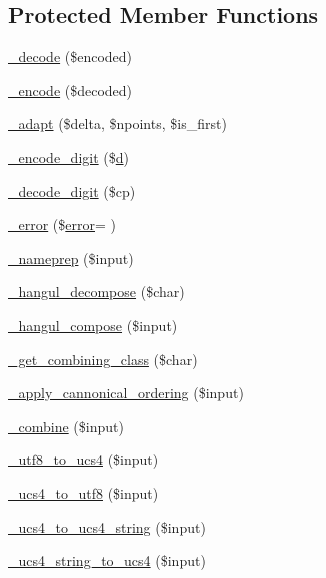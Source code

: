 \subsection*{Protected Member Functions}
\begin{DoxyCompactItemize}
\item 
\hyperlink{classidna__convert_a6e4c2f051cfd4ebd84d47c013c18205e}{\+\_\+decode} (\$encoded)
\item 
\hyperlink{classidna__convert_aa32f14e1635b5bcf8a1000721a53db8d}{\+\_\+encode} (\$decoded)
\item 
\hyperlink{classidna__convert_a521d4543ec6839af3283be4380e91a86}{\+\_\+adapt} (\$delta, \$npoints, \$is\+\_\+first)
\item 
\hyperlink{classidna__convert_afdb30c72ac13c3c71922afb63fabb37c}{\+\_\+encode\+\_\+digit} (\$\hyperlink{xpresseditor_8min_8js_aa27188e30a5d2270a230edf44af69623}{d})
\item 
\hyperlink{classidna__convert_adb87b0a6d3168899e718dff394723e96}{\+\_\+decode\+\_\+digit} (\$cp)
\item 
\hyperlink{classidna__convert_a16cb93864021e29871b9ad6716ab632c}{\+\_\+error} (\$\hyperlink{common_2js_2jquery_8js_ad9c7b7332a24ed93fb21cd053c99bd12}{error}= \textquotesingle{}\textquotesingle{})
\item 
\hyperlink{classidna__convert_ac73124acc2f1e772fadd64d176bfe0b9}{\+\_\+nameprep} (\$input)
\item 
\hyperlink{classidna__convert_a9cc5a89053729bb98d2a0ecf143b2b2c}{\+\_\+hangul\+\_\+decompose} (\$char)
\item 
\hyperlink{classidna__convert_a33124ab535f6739a2a5e6fa46c532d28}{\+\_\+hangul\+\_\+compose} (\$input)
\item 
\hyperlink{classidna__convert_abd868ffb75c0d7633998ab14f6621dd3}{\+\_\+get\+\_\+combining\+\_\+class} (\$char)
\item 
\hyperlink{classidna__convert_a3e0f3eceeb2987f2b69b9a3cf6f7181a}{\+\_\+apply\+\_\+cannonical\+\_\+ordering} (\$input)
\item 
\hyperlink{classidna__convert_a751b0b8bfacdc3b79eb77018a508363d}{\+\_\+combine} (\$input)
\item 
\hyperlink{classidna__convert_abafc3eb23a9da5e7b53c5f9f8b7ee035}{\+\_\+utf8\+\_\+to\+\_\+ucs4} (\$input)
\item 
\hyperlink{classidna__convert_a3827709d9c0e35a164838064f73daea5}{\+\_\+ucs4\+\_\+to\+\_\+utf8} (\$input)
\item 
\hyperlink{classidna__convert_ac353a6fccbc4e8e15e90772acb6e2a74}{\+\_\+ucs4\+\_\+to\+\_\+ucs4\+\_\+string} (\$input)
\item 
\hyperlink{classidna__convert_ac95599caba5f1a276ba1a75a12d385dd}{\+\_\+ucs4\+\_\+string\+\_\+to\+\_\+ucs4} (\$input)
\end{DoxyCompactItemize}

